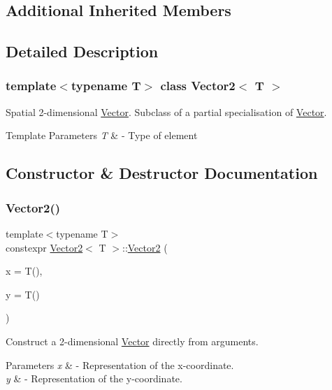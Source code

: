 \subsection*{Additional Inherited Members}


\subsection{Detailed Description}
\subsubsection*{template$<$typename T$>$\newline
class Vector2$<$ T $>$}

Spatial 2-\/dimensional \mbox{\hyperlink{class_vector}{Vector}}. Subclass of a partial specialisation of \mbox{\hyperlink{class_vector}{Vector}}. 
\begin{DoxyTemplParams}{Template Parameters}
{\em T} & -\/ Type of element \\
\hline
\end{DoxyTemplParams}


\subsection{Constructor \& Destructor Documentation}
\mbox{\label{class_vector2_a555afa6a898aede6b81e3bdf618e23bc}} 
\subsubsection{\texorpdfstring{Vector2()}{Vector2()}\hspace{0.1cm}{\footnotesize\ttfamily [1/2]}}
{\footnotesize\ttfamily template$<$typename T$>$ \\
constexpr \mbox{\hyperlink{class_vector2}{Vector2}}$<$ T $>$\+::\mbox{\hyperlink{class_vector2}{Vector2}} (\begin{DoxyParamCaption}\item[{T}]{x = {\ttfamily T()},  }\item[{T}]{y = {\ttfamily T()} }\end{DoxyParamCaption})}

Construct a 2-\/dimensional \mbox{\hyperlink{class_vector}{Vector}} directly from arguments. 
\begin{DoxyParams}{Parameters}
{\em x} & -\/ Representation of the x-\/coordinate. \\
\hline
{\em y} & -\/ Representation of the y-\/coordinate. \\
\hline
\end{DoxyParams}
\mbox{\label{class_vector2_ae611e87470765c3e8ed27bdc8971d0ce}} 
